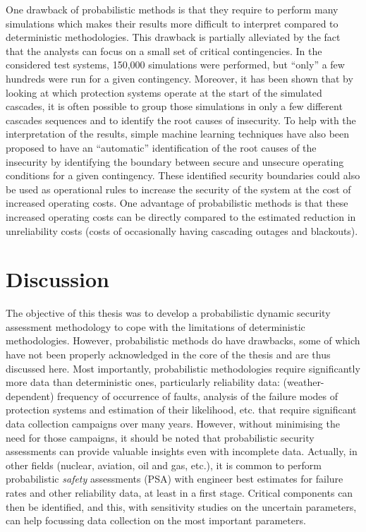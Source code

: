 One drawback of probabilistic methods is that they require to perform many simulations which makes their results more difficult to interpret compared to deterministic methodologies. This drawback is partially alleviated by the fact that the analysts can focus on a small set of critical contingencies. In the considered test systems, 150,000 simulations were performed, but ``only'' a few hundreds were run for a given contingency. Moreover, it has been shown that by looking at which protection systems operate at the start of the simulated cascades, it is often possible to group those simulations in only a few different cascades sequences and to identify the root causes of insecurity. To help with the interpretation of the results, simple machine learning techniques have also been proposed to have an ``automatic'' identification of the root causes of the insecurity by identifying the boundary between secure and unsecure operating conditions for a given contingency. These identified security boundaries could also be used as operational rules to increase the security of the system at the cost of increased operating costs. One advantage of probabilistic methods is that these increased operating costs can be directly compared to the estimated reduction in unreliability costs (\ie costs of occasionally having cascading outages and blackouts).

\section{Discussion}

The objective of this thesis was to develop a probabilistic dynamic security assessment methodology to cope with the limitations of deterministic methodologies. However, probabilistic methods do have drawbacks, some of which have not been properly acknowledged in the core of the thesis and are thus discussed here. Most importantly, probabilistic methodologies require significantly more data than deterministic ones, particularly reliability data: (weather-dependent) frequency of occurrence of faults, analysis of the failure modes of protection systems and estimation of their likelihood, etc. that require significant data collection campaigns over many years. However, without minimising the need for those campaigns, it should be noted that probabilistic security assessments can provide valuable insights even with incomplete data. Actually, in other fields (nuclear, aviation, oil and gas, etc.), it is common to perform probabilistic \emph{safety} assessments (PSA) with engineer best estimates for failure rates and other reliability data, at least in a first stage. Critical components can then be identified, and this, with sensitivity studies on the uncertain parameters, can help focussing data collection on the most important parameters.

